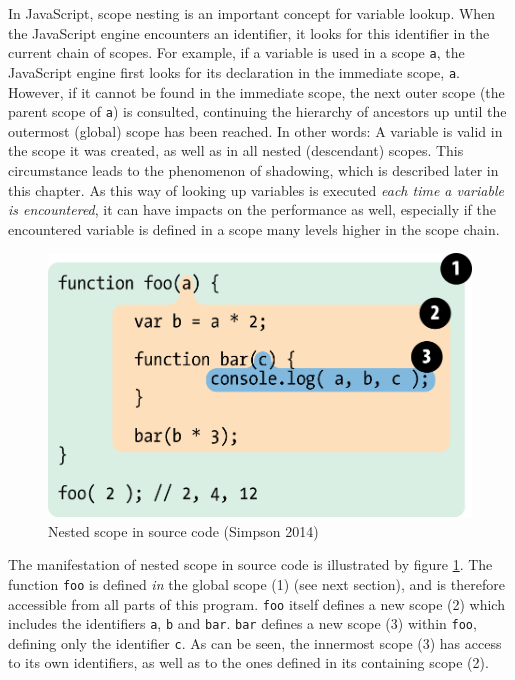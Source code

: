 In JavaScript, scope nesting is an important concept for variable
lookup. When the JavaScript engine encounters an identifier, it looks
for this identifier in the current chain of scopes. For example, if a
variable is used in a scope \texttt{a}, the JavaScript engine first
looks for its declaration in the immediate scope, \texttt{a}. However,
if it cannot be found in the immediate scope, the next outer scope (the
parent scope of \texttt{a}) is consulted, continuing the hierarchy of
ancestors up until the outermost (global) scope has been reached. In
other words: A variable is valid in the scope it was created, as well as
in all nested (descendant) scopes. This circumstance leads to the
phenomenon of shadowing, which is described later in this chapter. As
this way of looking up variables is executed \emph{each time a variable
is encountered}, it can have impacts on the performance as well,
especially if the encountered variable is defined in a scope many levels
higher in the scope chain.

\begin{figure}[htbp]
\centering
\includegraphics[keepaspectratio]{img/fig2.png}
\caption{Nested scope in source code (Simpson 2014)}
\label{fig:getify}
\end{figure}

The manifestation of nested scope in source code is illustrated by
figure \ref{fig:getify}. The \gls{function} \texttt{foo} is defined
\emph{in} the global scope (1) (see next section), and is therefore
accessible from all parts of this program. \texttt{foo} itself defines a
new scope (2) which includes the identifiers \texttt{a}, \texttt{b} and
\texttt{bar}. \texttt{bar} defines a new scope (3) within \texttt{foo},
defining only the identifier \texttt{c}. As can be seen, the innermost
scope (3) has access to its own identifiers, as well as to the ones
defined in its containing scope (2).

